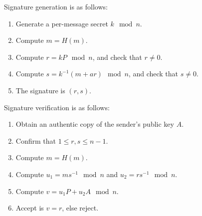 \documentclass[12pt,titlepage]{article}
\begin{document}
      Signature generation is as follows:
      \begin{enumerate}
        \item Generate a per-message secret $k \mod n$.
        \item Compute $m = H(m)$.
        \item Compute $r = kP \mod n$, and check that $r \neq 0$.
        \item Compute $s = k^{-1}(m + ar) \mod n$, and check that $s \neq 0$.
        \item The signature is $(r,s)$.
      \end{enumerate}

      Signature verification is as follows:
      \begin{enumerate}
        \item Obtain an authentic copy of the sender's public key $A$.
        \item Confirm that $1 \leq r, s \leq n - 1$.
        \item Compute $m = H(m)$.
        \item Compute $u_1 = ms^{-1} \mod n$ and $u_2 = rs^{-1} \mod n$.
        \item Compute $v = u_1P + u_2A \mod n$.
        \item Accept is $v = r$, else reject.
      \end{enumerate}
\end{document}
